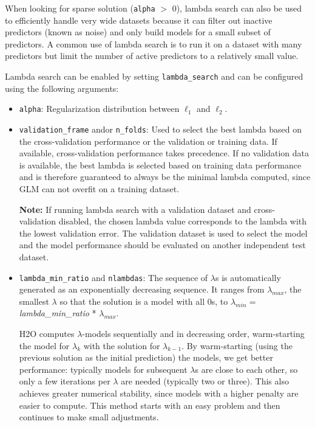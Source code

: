 When looking for sparse solution (\texttt{alpha} $>$ 0), lambda search can also be used to efficiently handle very wide datasets because it can filter out inactive predictors (known as noise) and only build models for a small subset of predictors. A common use of lambda search is to run it on a dataset with many predictors but limit the number of active predictors to a relatively small value.  

Lambda search can be enabled by setting \texttt{lambda\_search} and can be configured using the following arguments:

\begin{itemize}
\item \texttt{alpha}: Regularization distribution between  $\ell_1$ and  $\ell_2$.
\item \texttt{validation\_frame} and\/or \texttt{n\_folds}: Used to select the best lambda based on the cross-validation performance  or the validation or training data. If available, cross-validation performance takes precedence. If no validation data is available, the best lambda is selected based on training data performance and is therefore guaranteed to always be the minimal lambda computed, since GLM can not overfit on a training dataset.
 
\textbf{Note:} If running lambda search with a validation dataset and cross-validation disabled, the chosen lambda value corresponds to the lambda with the lowest validation error. The validation dataset is used to select the model and the model performance should be evaluated on another independent test dataset. 

\item \texttt{lambda\_min\_ratio} and \texttt{nlambdas}: The sequence of $\lambda$s is automatically generated as an exponentially decreasing sequence. It ranges from $\lambda_{max}$,
the smallest $\lambda$ so that the solution is a model with all 0s, to $\lambda_{min} =
$ \textit{lambda\_min\_ratio} * $ \lambda_{max}$.

H2O computes $\lambda$-models sequentially and in decreasing order, warm-starting the model for $\lambda_k$ with the solution for $\lambda_{k-1}$. By warm-starting (using the previous solution as the initial prediction) the models, we get better performance: typically models for subsequent $\lambda$s are close to each other, so only a few iterations per $\lambda$ are needed (typically two or three). This also achieves greater numerical stability, since models with a higher penalty are easier to compute. This method starts with an easy problem and then continues to make small adjustments. 


\end{itemize}
